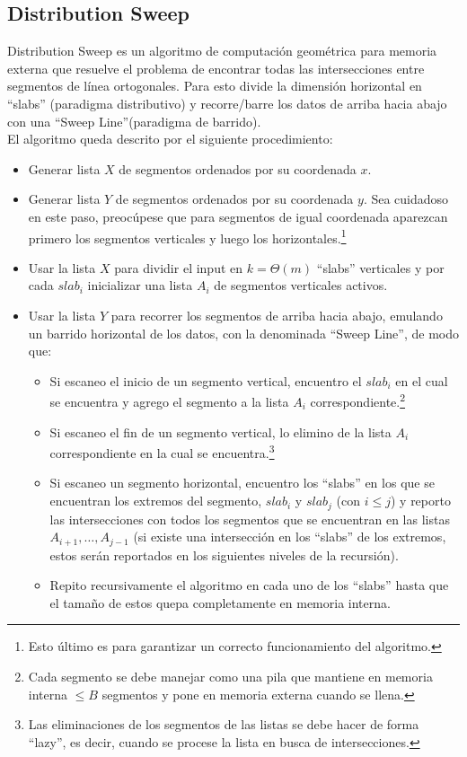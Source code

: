 \documentclass[dcc,uchile]{fcfmcourse}
\begin{document}
\subsection{Distribution Sweep}
Distribution Sweep es un algoritmo de computación geométrica para memoria externa que resuelve el problema de encontrar todas las intersecciones entre segmentos de línea ortogonales. Para esto divide la dimensión horizontal en ``slabs'' (paradigma distributivo) y recorre/barre los datos de arriba hacia abajo con una ``Sweep Line''(paradigma de barrido).\\
El algoritmo queda descrito por el siguiente procedimiento:
\begin{itemize}
    \item Generar lista $X$ de segmentos ordenados por su coordenada $x$.
    \item Generar lista $Y$ de segmentos ordenados por su coordenada $y$. Sea cuidadoso en este paso, preocúpese que para segmentos de igual coordenada aparezcan primero los segmentos verticales y luego los horizontales.\footnote{Esto último es para garantizar un correcto funcionamiento del algoritmo.}
    \item Usar la lista $X$ para dividir el input en $k = \Theta(m)$ ``slabs'' verticales y por cada $slab_{i}$ inicializar una lista $A_{i}$ de segmentos verticales activos.
    \item Usar la lista $Y$ para recorrer los segmentos de arriba hacia abajo, emulando un barrido horizontal de los datos, con la denominada ``Sweep Line'', de modo que:
    \begin{itemize}
        \item Si escaneo el inicio de un segmento vertical, encuentro el $slab_{i}$ en el cual se encuentra y agrego el segmento a la lista $A_{i}$ correspondiente.\footnote{Cada segmento se debe manejar como una pila que mantiene en memoria interna $\le B$ segmentos y pone en memoria externa cuando se llena.}
        \item Si escaneo el fin de un segmento vertical, lo elimino de la lista $A_{i}$ correspondiente en la cual se encuentra.\footnote{Las eliminaciones de los segmentos de las listas se debe hacer de forma ``lazy'', es decir, cuando se procese la lista en busca de intersecciones.}
        \item Si escaneo un segmento horizontal, encuentro los ``slabs'' en los que se encuentran los extremos del segmento, $slab_{i}$ y $slab_{j}$ (con $i \le j$) y reporto las intersecciones con todos los segmentos que se encuentran en las listas $A_{i+1},\ldots,A_{j-1}$ (si existe una intersección en los ``slabs'' de los extremos, estos serán reportados en los siguientes niveles de la recursión).
        \item Repito recursivamente el algoritmo en cada uno de los ``slabs'' hasta que el tamaño de estos quepa completamente en memoria interna.
    \end{itemize}
\end{itemize}
\end{document}
